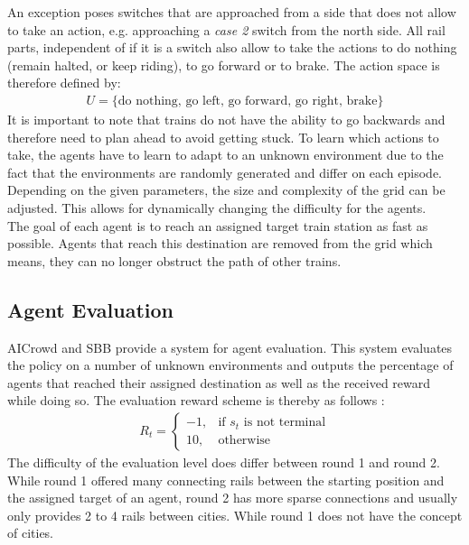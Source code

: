 An exception poses switches that are approached from a side that does not allow to take an action, e.g. approaching a \textit{case 2} switch from the north side.
All rail parts, independent of if it is a switch also allow to take the actions to do nothing (remain halted, or keep riding), to go forward or to brake.
The action space is therefore defined by:
\begin{gather*}
U = \{ \text{do nothing, go left, go forward, go right, brake} \}
\end{gather*}
It is important to note that trains do not have the ability to go backwards and therefore need to plan ahead to avoid getting stuck. To learn which actions to take, the agents have to learn to adapt to an unknown environment due to the fact that the environments are randomly generated and differ on each episode. Depending on the given parameters, the size and complexity of the grid can be adjusted. This allows for dynamically changing the difficulty for the agents.\\
The goal of each agent is to reach an assigned target train station as fast as possible. Agents that reach this destination are removed from the grid which means, they can no longer obstruct the path of other trains.
\subsection*{Agent Evaluation}\label{rl_agent_eval}
AICrowd and SBB provide a system for agent evaluation. This system evaluates the policy on a number of unknown environments and outputs the percentage of agents that reached their assigned destination as well as the received reward while doing so. The evaluation reward scheme is thereby as follows \cite{flatland_faq}:
\begin{gather*}
R_{t}= 
\begin{cases}
-1,				& \text{if } s_{t} \text{ is not terminal}\\
10,             & \text{otherwise}
\end{cases}
\end{gather*}
The difficulty of the evaluation level does differ between round 1 and round 2. While round 1 offered many connecting rails between the starting position and the assigned target of an agent, round 2 has more sparse connections and usually only provides 2 to 4 rails between cities. While round 1 does not have the concept of cities.

